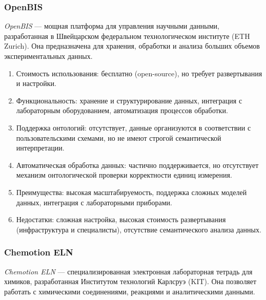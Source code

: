 \subsubsection{OpenBIS}

\textit{OpenBIS}\cite{ELN:OpenBIS} — мощная платформа для управления научными данными, разработанная в Швейцарском федеральном технологическом институте (ETH Zurich). Она предназначена для хранения, обработки и анализа больших объемов экспериментальных данных.

\begin{enumerate}
    \item Стоимость использования: бесплатно (open-source), но требует развертывания и настройки.
    \item Функциональность: хранение и структурирование данных, интеграция с лабораторным оборудованием, автоматизация процессов обработки.
    \item Поддержка онтологий: отсутствует, данные организуются в соответствии с пользовательскими схемами, но не имеют строгой семантической интерпретации.
    \item Автоматическая обработка данных: частично поддерживается, но отсутствует механизм онтологической проверки корректности единиц измерения.
    \item Преимущества: высокая масштабируемость, поддержка сложных моделей данных, интеграция с лабораторными приборами.
    \item Недостатки: сложная настройка, высокая стоимость развертывания (инфраструктура и специалисты), отсутствие семантического анализа данных.
\end{enumerate}

\subsubsection{Chemotion ELN}

\textit{Chemotion ELN}\cite{ELN:Chemotion} — специализированная электронная лабораторная тетрадь для химиков, разработанная Институтом технологий Карлсруэ (KIT). Она позволяет работать с химическими соединениями, реакциями и аналитическими данными.

